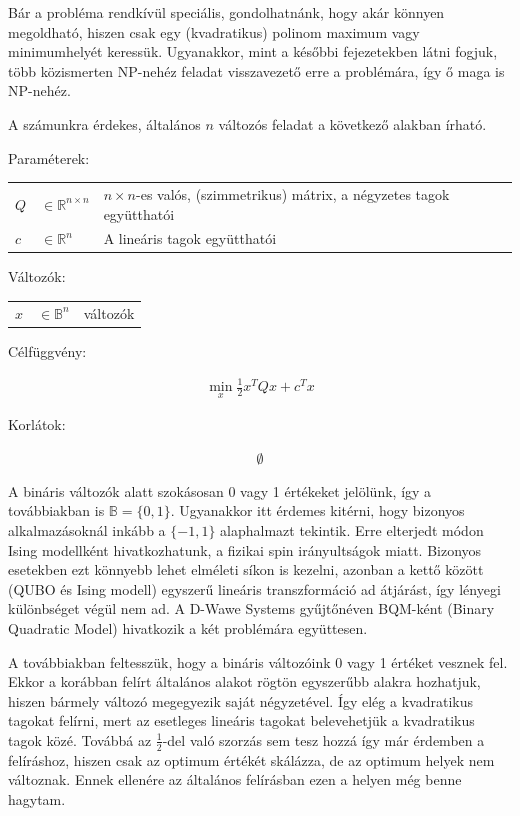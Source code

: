 Bár a probléma rendkívül speciális, gondolhatnánk, hogy akár könnyen megoldható, hiszen csak egy (kvadratikus) polinom maximum vagy minimumhelyét keressük. Ugyanakkor, mint a későbbi fejezetekben látni fogjuk, több közismerten NP-nehéz feladat visszavezető erre a problémára, így ő maga is NP-nehéz. 

A számunkra érdekes, általános $n$ változós feladat a következő alakban írható.

Paraméterek:

\begin{tabular}{lll}
	$Q$ & $\in \mathbb{R}^{n×n}$  & $n × n$-es valós, (szimmetrikus) mátrix, a négyzetes tagok együtthatói \\
	$c$ & $\in \mathbb{R}^n$   & A lineáris tagok együtthatói \\
\end{tabular}

Változók:

\begin{tabular}{lll}
	$x$ & $\in \mathbb{B}^n$ & változók \\
\end{tabular}

Célfüggvény:

\begin{align}
	\min_{x} \frac{1}{2} x^T Q x + c^T x 
\end{align}

Korlátok:

\begin{align}
	\emptyset
\end{align}

A bináris változók alatt szokásosan 0 vagy 1 értékeket jelölünk, így a továbbiakban is $\mathbb{B}=\{0,1\}$. Ugyanakkor itt érdemes kitérni, hogy bizonyos alkalmazásoknál inkább a $\{-1,1\}$ alaphalmazt tekintik. Erre elterjedt módon Ising modellként hivatkozhatunk, a fizikai spin irányultságok miatt. Bizonyos esetekben ezt könnyebb lehet elméleti síkon is kezelni, azonban a kettő között (QUBO és Ising modell) egyszerű lineáris transzformáció ad átjárást, így lényegi különbséget végül nem ad. A D-Wawe Systems gyűjtőnéven BQM-ként (Binary Quadratic Model) hivatkozik a két problémára együttesen\cite{DWaveOceanBQM}.

A továbbiakban feltesszük, hogy a bináris változóink 0 vagy 1 értéket vesznek fel. Ekkor a korábban felírt általános alakot rögtön egyszerűbb alakra hozhatjuk, hiszen bármely változó megegyezik saját négyzetével. Így elég a kvadratikus tagokat felírni, mert az esetleges lineáris tagokat belevehetjük a kvadratikus tagok közé. Továbbá az $\frac{1}{2}$-del való szorzás sem tesz hozzá így már érdemben a felíráshoz, hiszen csak az optimum értékét skálázza, de az optimum helyek nem változnak. Ennek ellenére az általános felírásban ezen a helyen még benne hagytam.

